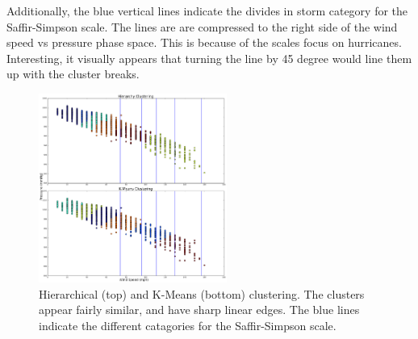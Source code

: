 \documentclass{article}
\begin{document}
		Additionally, the blue vertical lines indicate the divides in storm category for the Saffir-Simpson scale. The lines are are compressed to the right side of the wind speed vs pressure phase space. This is because of the scales focus on hurricanes. Interesting, it visually appears that turning the line by 45 degree would line them up with the cluster breaks.

	\begin{figure}
			\centering
			\includegraphics[width=0.55\textwidth]{images/cluster.png}
		\caption{Hierarchical (top) and K-Means (bottom) clustering. The clusters appear fairly similar, and have sharp linear edges. The blue lines indicate the different catagories for the Saffir-Simpson scale.}
		\label{cluster}
	\end{figure}

	\pagebreak
	
	
	
\end{document}
